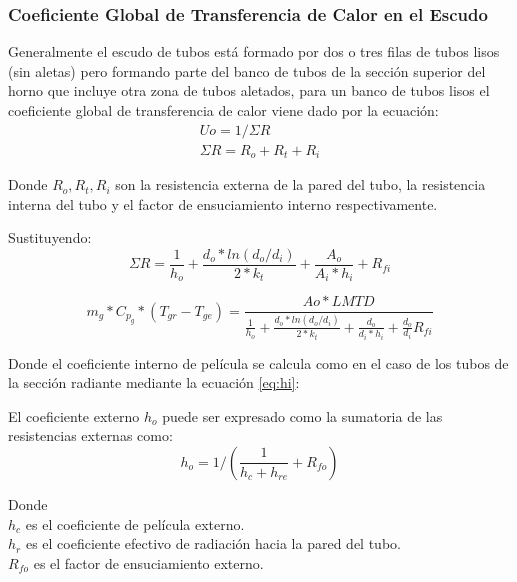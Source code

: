 \subsubsection{Coeficiente Global de Transferencia de Calor en el Escudo}

\par Generalmente el escudo de tubos está formado por dos o tres filas de tubos lisos (sin aletas) pero formando parte del banco de tubos de la sección superior del horno que incluye otra zona de tubos aletados, para un banco de tubos lisos el coeficiente global de transferencia de calor viene dado por la ecuación:
\begin{gather*}
\label{}
Uo  = 1 / \Sigma R \\
\Sigma R = R_o + R_t + R_i
\end{gather*}

\par Donde $R_o, R_t, R_i$ son la resistencia externa de la pared del tubo, la resistencia interna del tubo y el factor de ensuciamiento interno respectivamente.
\par Sustituyendo:
\begin{equation}
\label{}
\Sigma R = \frac{1}{h_o} +\frac{d_o*ln(d_o/d_i)}{2*k_t} +\frac{A_o}{A_i*h_i} +R_{fi}
\end{equation}

\begin{equation}
\label{}
m_{g} *C_{p_g} *(T_{gr} - T_{ge}) = \frac{Ao *LMTD}
{\frac{1}{h_o} +\frac{d_o*ln(d_o/d_i)}{2*k_t} +\frac{d_o}{d_i*h_i} +\frac{d_o}{d_i}R_{fi}}
\end{equation}

\par Donde el coeficiente interno de película se calcula como en el caso de los tubos de la sección radiante mediante la ecuación \ref{eq:hi}:

\par El coeficiente externo $h_o$ puede ser expresado como la sumatoria de las resistencias externas como:
\begin{equation}
\label{eq:ho}
h_o = 1/(\frac{1}{h_c + h_{re}} + R_{fo})
\end{equation}
\par Donde \\
$h_c$ es el coeficiente de película externo.\\
$h_r$ es el coeficiente efectivo de radiación hacia la pared del tubo.\\
$R_{fo}$ es el factor de ensuciamiento externo.\\

